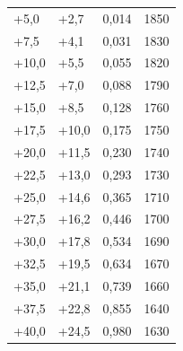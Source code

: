 \documentclass{scrartcl}
\begin{document}
\begin{table}[H]
\begin{center}
\begin{tabular}{l|l|l|l}
+5,0    &   +2,7    &   0,014   &   1850 \\
+7,5    &   +4,1    &   0,031   &   1830 \\
+10,0   &   +5,5    &   0,055   &   1820 \\
+12,5   &   +7,0    &   0,088   &   1790 \\
+15,0   &   +8,5    &   0,128   &   1760 \\
+17,5   &   +10,0   &   0,175   &   1750 \\
+20,0   &   +11,5   &   0,230   &   1740 \\
+22,5   &   +13,0   &   0,293   &   1730 \\
+25,0   &   +14,6   &   0,365   &   1710 \\
+27,5   &   +16,2   &   0,446   &   1700 \\
+30,0   &   +17,8   &   0,534   &   1690 \\
+32,5   &   +19,5   &   0,634   &   1670 \\
+35,0   &   +21,1   &   0,739   &   1660 \\
+37,5   &   +22,8   &   0,855   &   1640 \\
+40,0   &   +24,5   &   0,980   &   1630 
\end{tabular}
\end{center}
\label{tab:Metallfadenlampe}
\end{table}
\end{document}
